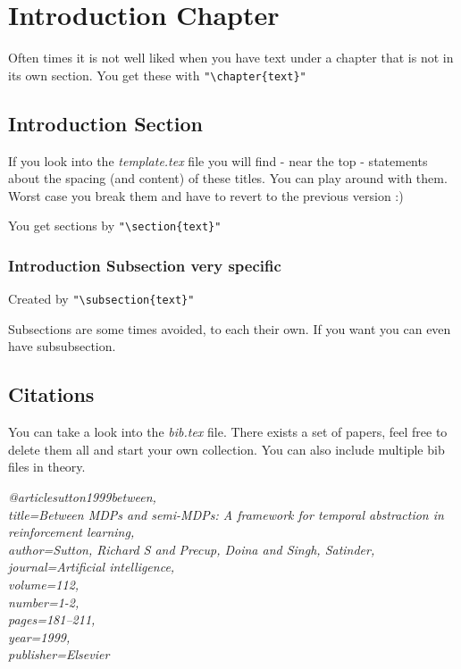 
\chapter{Introduction Chapter}

Often times it is not well liked when you have text under a chapter that is not in its own section. You get these with \verb!"\chapter{text}"!

\section{Introduction Section}

If you look into the \textit{template.tex} file you will find - near the top - statements about the spacing (and content) of these titles. You can play around with them. Worst case you break them and have to revert to the previous version :)

You get sections by \verb!"\section{text}"!

\subsection{Introduction Subsection very specific}
Created by \verb!"\subsection{text}"!

Subsections are some times avoided, to each their own. If you want you can even have subsubsection.


\section{Citations}
You can take a look into the \textit{bib.tex} file. There exists a set of papers, feel free to delete them all and start your own collection. You can also include multiple bib files in theory.

\textit{@article{sutton1999between, \\
	title={Between MDPs and semi-MDPs: A framework for temporal abstraction in reinforcement learning}, \\
	author={Sutton, Richard S and Precup, Doina and Singh, Satinder}, \\
	journal={Artificial intelligence}, \\
	volume={112}, \\
	number={1-2}, \\
	pages={181--211}, \\
	year={1999}, \\
	publisher={Elsevier} \\
}}

